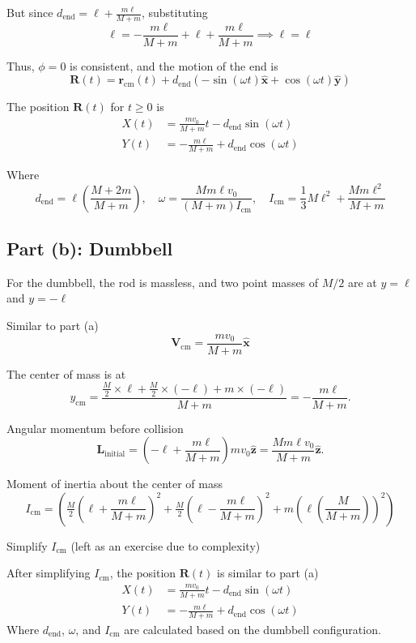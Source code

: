 \documentclass[12pt]{article}
\begin{document}
But since $d_{\text{end}} = \ell + \frac{m \ell}{M + m}$, substituting
\[
\ell = -\frac{m \ell}{M + m} + \ell + \frac{m \ell}{M + m} \implies \ell = \ell
\]

Thus, $\phi = 0$ is consistent, and the motion of the end is
\[
\mathbf{R}(t) = \mathbf{r}_{\text{cm}}(t) + d_{\text{end}} \left( -\sin(\omega t) \hat{\mathbf{x}} + \cos(\omega t) \hat{\mathbf{y}} \right)
\]

The position $\mathbf{R}(t)$ for $t \geq 0$ is
\[
\begin{aligned}
X(t) &= \frac{m v_0}{M + m} t - d_{\text{end}} \sin(\omega t) \\
Y(t) &= -\frac{m \ell}{M + m} + d_{\text{end}} \cos(\omega t)
\end{aligned}
\]

Where
\[
d_{\text{end}} = \ell \left( \frac{M + 2m}{M + m} \right), \quad \omega = \frac{M m \ell v_0}{(M + m) I_{\text{cm}}}, \quad I_{\text{cm}} = \frac{1}{3} M \ell^2 + \frac{M m \ell^2}{M + m}
\]

\subsection*{Part (b): Dumbbell}

For the dumbbell, the rod is massless, and two point masses of $M/2$ are at $y = \ell$ and $y = -\ell$

Similar to part (a)
\[
\mathbf{V}_{\text{cm}} = \frac{m v_0}{M + m} \hat{\mathbf{x}}
\]

The center of mass is at
\[
y_{\text{cm}} = \frac{\tfrac{M}{2} \times \ell + \tfrac{M}{2} \times (-\ell) + m \times (-\ell)}{M + m} = -\frac{m \ell}{M + m}.
\]

Angular momentum before collision
\[
\mathbf{L}_{\text{initial}} = \left( -\ell + \frac{m \ell}{M + m} \right) m v_0 \hat{\mathbf{z}} = \frac{M m \ell v_0}{M + m} \hat{\mathbf{z}}.
\]

Moment of inertia about the center of mass
\[
I_{\text{cm}} = \left( \tfrac{M}{2} \left( \ell + \frac{m \ell}{M + m} \right)^2 + \tfrac{M}{2} \left( \ell - \frac{m \ell}{M + m} \right)^2 + m \left( \ell \left( \frac{M}{M + m} \right) \right)^2 \right)
\]

Simplify $I_{\text{cm}}$ (left as an exercise due to complexity)


After simplifying $I_{\text{cm}}$, the position $\mathbf{R}(t)$ is similar to part (a)
\[
\begin{aligned}
X(t) &= \frac{m v_0}{M + m} t - d_{\text{end}} \sin(\omega t) \\
Y(t) &= -\frac{m \ell}{M + m} + d_{\text{end}} \cos(\omega t)
\end{aligned}
\]
Where $d_{\text{end}}$, $\omega$, and $I_{\text{cm}}$ are calculated based on the dumbbell configuration.
\end{document}
